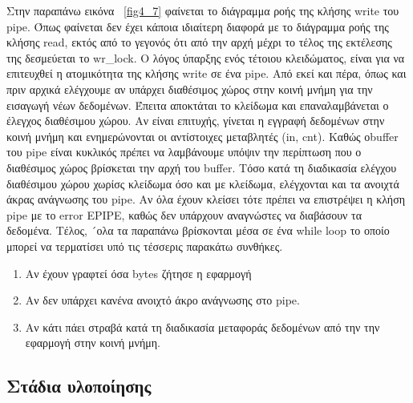 Στην παραπάνω εικόνα ~\ref{fig4_7} φαίνεται το διάγραμμα ροής της κλήσης write
του pipe. Όπως φαίνεται δεν έχει κάποια ιδιαίτερη διαφορά με το διάγραμμα ροής
της κλήσης read, εκτός από το γεγονός ότι από την αρχή μέχρι το τέλος της
εκτέλεσης της δεσμεύεται το wr\_lock. Ο λόγος ύπαρξης ενός τέτοιου κλειδώματος,
είναι για να επιτευχθεί η ατομικότητα της κλήσης write σε ένα pipe. Από εκεί και
πέρα, όπως και πριν αρχικά ελέγχουμε αν υπάρχει διαθέσιμος χώρος στην κοινή
μνήμη για την εισαγωγή νέων δεδομένων. Έπειτα αποκτάται το κλείδωμα και
επαναλαμβάνεται ο έλεγχος διαθέσιμου χώρου. Αν είναι επιτυχής, γίνεται η εγγραφή
δεδομένων στην κοινή μνήμη και ενημερώνονται οι αντίστοιχες μεταβλητές (in,
cnt). Καθώς οbuffer του pipe είναι κυκλικός πρέπει να λαμβάνουμε υπόψιν την
περίπτωση που ο διαθέσιμος χώρος βρίσκεται την αρχή του buffer. Τόσο κατά τη
διαδικασία ελέγχου διαθέσιμου χώρου χωρίσς κλείδωμα όσο και με κλείδωμα,
ελέγχονται και τα ανοιχτά άκρας ανάγνωσης του pipe. Αν όλα έχουν κλείσει τότε
πρέπει να επιστρέψει η κλήση pipe με το error EPIPE, καθώς δεν υπάρχουν
αναγνώστες να διαβάσουν τα δεδομένα. Τέλος, ´ολα τα παραπάνω βρίσκονται μέσα σε
ένα while loop το οποίο μπορεί να τερματίσει υπό τις τέσσερις παρακάτω συνθήκες.
\begin{enumerate}
	\item Αν έχουν γραφτεί όσα bytes ζήτησε η εφαρμογή
	\item Αν δεν υπάρχει κανένα ανοιχτό άκρο ανάγνωσης στο pipe.
	\item Αν κάτι πάει στραβά κατά τη διαδικασία μεταφοράς δεδομένων από την
		την εφαρμογή στην κοινή μνήμη.
\end{enumerate}

\subsection{Στάδια υλοποίησης}


